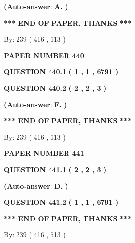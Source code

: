 \documentclass[12pt]{article}
\begin{document}
 
{\textbf{(Auto-answer:}}
{\textbf{\large{
A.}}}
{\textbf{)}}
 
 
   
   
   
   
\vspace{1.0in} 
{\textbf{\large{ *** END OF PAPER, THANKS *** }}} 
   
   
\hspace{1.0in} By: 
 239 ( 416 ,  613 )
   
   
   
   
\newpage 
\setcounter{page}{ 
   440001 } 
   
   
 {\textbf{ \Large{ PAPER NUMBER  440  }}}
   
   
   
   
  
  
{\textbf{\large{QUESTION
440.1 
 ( 1 , 1 , 6791 )
}}}
  
  
{\textbf{\large{QUESTION
440.2 
 ( 2 , 2 , 3 )
}}}
 
 
{\textbf{(Auto-answer:}}
{\textbf{\large{
F.}}}
{\textbf{)}}
 
 
   
   
   
   
\vspace{1.0in} 
{\textbf{\large{ *** END OF PAPER, THANKS *** }}} 
   
   
\hspace{1.0in} By: 
 239 ( 416 ,  613 )
   
   
   
   
\newpage 
\setcounter{page}{ 
   441001 } 
   
   
 {\textbf{ \Large{ PAPER NUMBER  441  }}}
   
   
   
   
  
  
{\textbf{\large{QUESTION
441.1 
 ( 2 , 2 , 3 )
}}}
 
 
{\textbf{(Auto-answer:}}
{\textbf{\large{
D.}}}
{\textbf{)}}
 
 
  
  
{\textbf{\large{QUESTION
441.2 
 ( 1 , 1 , 6791 )
}}}
   
   
   
   
\vspace{1.0in} 
{\textbf{\large{ *** END OF PAPER, THANKS *** }}} 
   
   
\hspace{1.0in} By: 
 239 ( 416 ,  613 )
   
   
   
   
\newpage 
\setcounter{page}{ 
   442001 } 
   
\end{document}
